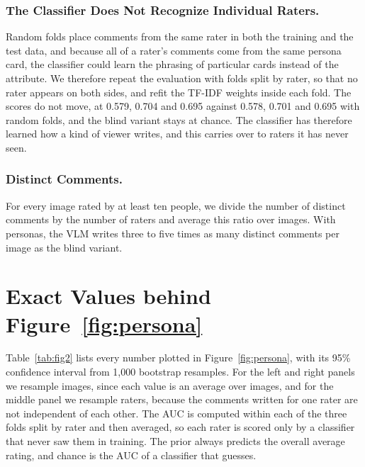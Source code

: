 \documentclass[runningheads]{llncs}
\begin{document}
\subsubsection{The Classifier Does Not Recognize Individual Raters.} Random folds place comments from the same rater in both the training and the test data, and because all of a rater's comments come from the same persona card, the classifier could learn the phrasing of particular cards instead of the attribute. We therefore repeat the evaluation with folds split by rater, so that no rater appears on both sides, and refit the TF-IDF weights inside each fold. The scores do not move, at 0.579, 0.704 and 0.695 against 0.578, 0.701 and 0.695 with random folds, and the blind variant stays at chance. The classifier has therefore learned how a kind of viewer writes, and this carries over to raters it has never seen.

\subsubsection{Distinct Comments.} For every image rated by at least ten people, we divide the number of distinct comments by the number of raters and average this ratio over images. With personas, the VLM writes three to five times as many distinct comments per image as the blind variant.

\section{Exact Values behind Figure~\ref{fig:persona}}
\label{sup:fig2}
Table~\ref{tab:fig2} lists every number plotted in Figure~\ref{fig:persona}, with its 95\% confidence interval from 1{,}000 bootstrap resamples. For the left and right panels we resample images, since each value is an average over images, and for the middle panel we resample raters, because the comments written for one rater are not independent of each other. The AUC is computed within each of the three folds split by rater and then averaged, so each rater is scored only by a classifier that never saw them in training. The prior always predicts the overall average rating, and chance is the AUC of a classifier that guesses.
\end{document}
